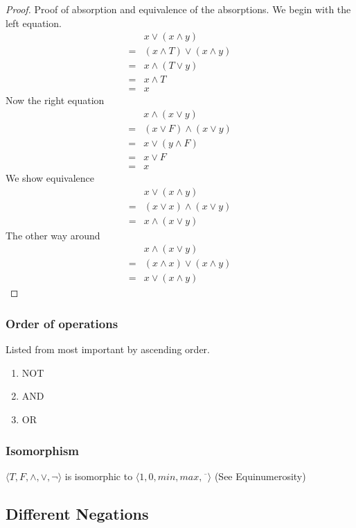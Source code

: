 \documentclass[a4paper]{article}
\theoremstyle{plain}
\theoremstyle{definition}
\theoremstyle{remark}
\begin{document}
\begin{proof}
	Proof of absorption and equivalence of the absorptions. We begin with the left equation.
	\begin{align*}
		&x \lor (x \land y)\\
		= &\left( x \land T \right) \lor \left( x \land y \right) \\
		= & x \land (T \lor y)\\
		= & x \land T\\
		= & x
	\end{align*}
	Now the right equation
	\begin{align*}
		&x \land (x \lor y)\\
		= &(x \lor F) \land \left( x \lor y \right) \\
		= &x \lor (y \land F)\\
		= &x \lor F\\
		= & x
	\end{align*}
	We show equivalence
	\begin{align*}
		&x \lor \left( x \land y \right) \\
		= & \left( x \lor x \right) \land (x \lor y)\\
		= & x \land (x \lor y)
	\end{align*}
	The other way around
	\begin{align*}
		&x \land \left( x \lor y \right)\\ 
		=&(x \land x) \lor (x \land y)\\
		=&x \lor (x \land y)
	\end{align*}
\end{proof}
\subsubsection{Order of operations}
Listed from most important by ascending order.
\begin{enumerate}
	\item NOT
	\item AND
	\item OR
\end{enumerate}
\subsubsection{Isomorphism}
$\langle T,F,\land,\lor,\neg \rangle$ is isomorphic to $\langle 1,0,min,max,\overline{\phantom{r}} \rangle$ (See Equinumerosity)
\subsection{Different Negations}
\end{document}
